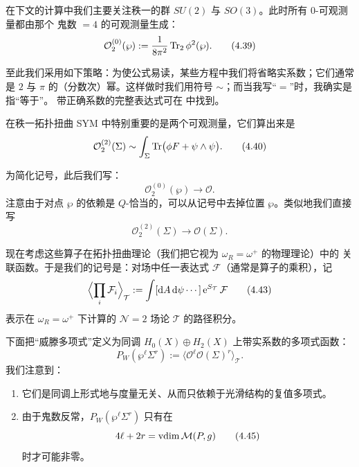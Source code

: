 
在下文的计算中我们主要关注秩一的群 $SU(2)$ 与 $SO(3)$。此时所有 0-可观测量都由那个
鬼数 $=4$ 的可观测量生成：
\begin{equation}
  \mathcal{O}^{(0)}_{2}(\wp):=\frac{1}{8\pi^{2}}\operatorname{Tr}_{2}\phi^{2}(\wp).
  \tag{4.39}
\end{equation}

至此我们采用如下策略：为使公式易读，某些方程中我们将省略实系数；它们通常是 $2$ 与
$\pi$ 的（分数次）幂。这样做时我们用符号 $\sim$；而当我写“$=$”时，我确实是指“等于”。
带正确系数的完整表达式可在 \cite{ref38} 中找到。

在秩一拓扑扭曲 SYM 中特别重要的是两个可观测量，它们算出来是
\begin{equation}
  \mathcal{O}^{(2)}_{2}(\Sigma)\sim\int_{\Sigma}\operatorname{Tr}\bigl(\phi F+\psi\wedge\psi\bigr).
  \tag{4.40}
\end{equation}

为简化记号，此后我们写：
\begin{equation}
  \mathcal{O}^{(0)}_{2}(\wp)\to\mathcal{O}.
  \tag{4.41}
\end{equation}
注意由于对点 $\wp$ 的依赖是 $Q$-恰当的，可以从记号中去掉位置 $\wp$。类似地我们直接写
\begin{equation}
  \mathcal{O}^{(2)}_{2}(\Sigma)\to\mathcal{O}(\Sigma).
  \tag{4.42}
\end{equation}

现在考虑这些算子在拓扑扭曲理论（我们把它视为 $\omega_{R}=\omega^{+}$ 的物理理论）中的
关联函数。于是我们的记号是：对场中任一表达式 $\mathcal{F}$（通常是算子的乘积），记
\begin{equation}
  \Bigl\langle\prod_{i}\mathcal{F}_{i}\Bigr\rangle_{\mathcal{T}}
  :=\int[\mathrm{d} A\,\mathrm{d}\psi\cdots]\,\mathrm{e}^{S_{\mathcal{T}}}\,\mathcal{F}
  \tag{4.43}
\end{equation}
表示在 $\omega_{R}=\omega^{+}$ 下计算的 $\mathcal{N}=2$ 场论 $\mathcal{T}$ 的路径积分。

下面把“威滕多项式”定义为同调 $H_{0}(X)\oplus H_{2}(X)$ 上带实系数的多项式函数：
\begin{equation}
  P_{W}(\wp^{\ell}\Sigma^{r})
  :=\bigl\langle\mathcal{O}^{\ell}\mathcal{O}(\Sigma)^{r}\bigr\rangle_{\mathcal{T}}.
  \tag{4.44}
\end{equation}
我们注意到：
\begin{enumerate}[label=\arabic*., leftmargin=2.2em]
  \item 它们是同调上形式地与度量无关、从而只依赖于光滑结构的复值多项式。
  \item 由于鬼数反常，$P_{W}(\wp^{\ell}\Sigma^{r})$ 只有在
    \begin{equation}
      4\ell+2r=\operatorname{vdim}\mathcal{M}(P,g)
      \tag{4.45}
    \end{equation}
    时才可能非零。
\end{enumerate}

